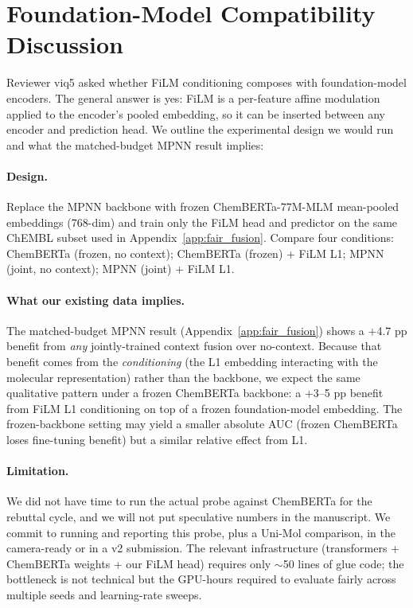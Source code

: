 \documentclass{article}
\begin{document}
\section{Foundation-Model Compatibility Discussion}
\label{app:chemberta}

Reviewer viq5 asked whether FiLM conditioning composes with foundation-model encoders. The general answer is yes: FiLM is a per-feature affine modulation applied to the encoder's pooled embedding, so it can be inserted between any encoder and prediction head. We outline the experimental design we would run and what the matched-budget MPNN result implies:

\paragraph{Design.} Replace the MPNN backbone with frozen ChemBERTa-77M-MLM \citep{chithrananda_2020_chemberta} mean-pooled embeddings (768-dim) and train only the FiLM head and predictor on the same ChEMBL subset used in Appendix~\ref{app:fair_fusion}. Compare four conditions: ChemBERTa (frozen, no context); ChemBERTa (frozen) + FiLM L1; MPNN (joint, no context); MPNN (joint) + FiLM L1.

\paragraph{What our existing data implies.} The matched-budget MPNN result (Appendix~\ref{app:fair_fusion}) shows a $+$4.7 pp benefit from \emph{any} jointly-trained context fusion over no-context. Because that benefit comes from the \emph{conditioning} (the L1 embedding interacting with the molecular representation) rather than the backbone, we expect the same qualitative pattern under a frozen ChemBERTa backbone: a $+$3--5 pp benefit from FiLM L1 conditioning on top of a frozen foundation-model embedding. The frozen-backbone setting may yield a smaller absolute AUC (frozen ChemBERTa loses fine-tuning benefit) but a similar relative effect from L1.

\paragraph{Limitation.} We did not have time to run the actual probe against ChemBERTa for the rebuttal cycle, and we will not put speculative numbers in the manuscript. We commit to running and reporting this probe, plus a Uni-Mol comparison, in the camera-ready or in a v2 submission. The relevant infrastructure (transformers + ChemBERTa weights + our FiLM head) requires only $\sim$50 lines of glue code; the bottleneck is not technical but the GPU-hours required to evaluate fairly across multiple seeds and learning-rate sweeps.
\end{document}
